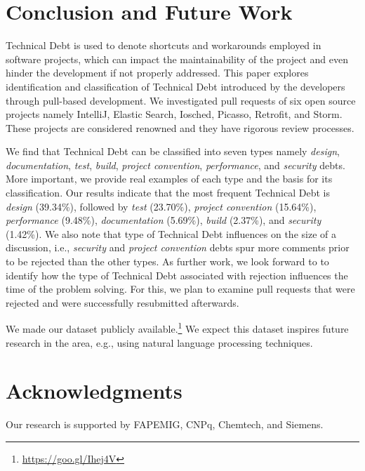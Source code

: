 \documentclass{sig-alternate}
\begin{document}
\section{Conclusion and Future Work}
\label{sec:conclusion}
Technical Debt is used to denote shortcuts and workarounds employed in software projects, which can impact the maintainability of the project and even hinder the development if not properly addressed. This paper explores identification and classification of Technical Debt introduced by the developers through pull-based development. We investigated pull requests of six open source projects namely IntelliJ, Elastic Search, Iosched, Picasso, Retrofit, and Storm. These projects are considered renowned and they have rigorous review processes. %

We find that Technical Debt can be classified into seven types namely {\em design}, {\em documentation}, {\em test}, {\em build}, {\em project convention}, {\em performance}, and {\em security} debts.  
More important, we provide real examples of each type and the basis for its classification.
%
{Our results indicate that the most frequent Technical Debt is
\textit{design} (39.34\%), followed by
\textit{test} (23.70\%), 
\textit{project convention} (15.64\%), 
\textit{performance} (9.48\%), 
\textit{documentation} (5.69\%),
\textit{build} (2.37\%), and
\textit{security} (1.42\%)}.
We also note that type of Technical Debt influences on the size of a discussion, i.e., {\em security} and {\em project convention} debts spur more comments prior to be rejected than the other types.
As further work, we look forward to to identify how the type of Technical Debt associated with rejection influences the time of the problem solving. For this, we plan to examine pull requests that were rejected and were successfully resubmitted afterwards.

We made our dataset  publicly available.\footnote{\url{https://goo.gl/Ihej4V}} 
We expect this dataset inspires future research in the area, e.g., using natural language processing techniques.



\section*{Acknowledgments}
Our research is supported by FAPEMIG, CNPq, Chemtech, and Siemens.\\
\end{document}
